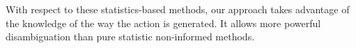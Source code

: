 \documentclass[letterpaper, 10pt, conference]{ieeeconf}      %
\begin{document}
With respect to these statistics-based methods, our approach takes advantage of the
knowledge of the way the action is generated. It allows more powerful
disambiguation than pure statistic non-informed methods.\\


\end{document}
